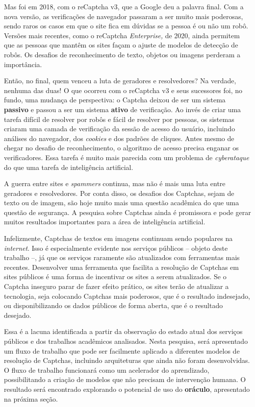 \documentclass[12pt,twoside,brazilian]{book}
\begin{document}
Mas foi em 2018, com o reCaptcha v3, que a Google deu a palavra final.
Com a nova versão, as verificações de navegador passaram a ser muito
mais poderosas, sendo raros os casos em que o site fica em dúvidas se a
pessoa é ou não um robô. Versões mais recentes, como o reCaptcha
\emph{Enterprise,} de 2020, ainda permitem que as pessoas que mantêm os
sites façam o ajuste de modelos de detecção de robôs. Os desafios de
reconhecimento de texto, objetos ou imagens perderam a importância.

Então, no final, quem venceu a luta de geradores e resolvedores? Na
verdade, nenhuma das duas! O que ocorreu com o reCaptcha v3 e seus
sucessores foi, no fundo, uma mudança de perspectiva: o Captcha deixou
de ser um sistema \textbf{passivo} e passou a ser um sistema
\textbf{ativo} de verificação. Ao invés de criar uma tarefa difícil de
resolver por robôs e fácil de resolver por pessoas, os sistemas criaram
uma camada de verificação da sessão de acesso do usuário, incluindo
análises do navegador, dos \emph{cookies} e dos padrões de cliques.
Antes mesmo de chegar no desafio de reconhecimento, o algoritmo de
acesso precisa enganar os verificadores. Essa tarefa é muito mais
parecida com um problema de \emph{cyberataque} do que uma tarefa de
inteligência artificial.

A guerra entre sites e \emph{spammers} continua, mas não é mais uma luta
entre geradores e resolvedores. Por conta disso, os desafios dos
Captchas, sejam de texto ou de imagem, são hoje muito mais uma questão
acadêmica do que uma questão de segurança. A pesquisa sobre Captchas
ainda é promissora e pode gerar muitos resultados importantes para a
área de inteligência artificial.

Infelizmente, Captchas de textos em imagens continuam sendo populares na
\emph{internet}. Isso é especialmente evidente nos serviços públicos --
objeto deste trabalho --, já que os serviços raramente são atualizados
com ferramentas mais recentes. Desenvolver uma ferramenta que facilita a
resolução de Captchas em sites públicos é uma forma de incentivar os
sites a serem atualizados. Se o Captcha inseguro parar de fazer efeito
prático, os sites terão de atualizar a tecnologia, seja colocando
Captchas mais poderosos, que é o resultado indesejado, ou
disponibilizando os dados públicos de forma aberta, que é o resultado
desejado.

Essa é a lacuna identificada a partir da observação do estado atual dos
serviços públicos e dos trabalhos acadêmicos analisados. Nesta pesquisa,
será apresentado um fluxo de trabalho que pode ser facilmente aplicado a
diferentes modelos de resolução de Captchas, incluindo arquiteturas que
ainda não foram desenvolvidas. O fluxo de trabalho funcionará como um
acelerador do aprendizado, possibilitando a criação de modelos que não
precisam de intervenção humana. O resultado será encontrado explorando o
potencial de uso do \textbf{oráculo}, apresentado na próxima seção.
\end{document}
